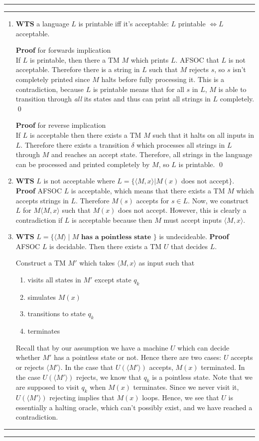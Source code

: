\documentclass[11pt]{article}
\newcounter{questionCounter}
\newcounter{partCounter}[questionCounter]
\newenvironment{question}[2][\arabic{questionCounter}]{%
    \setcounter{partCounter}{0}%
    \vspace{.25in} \hrule \vspace{0.5em}%
        \noindent{\bf #2}%
    \vspace{0.8em} \hrule \vspace{.10in}%
    \addtocounter{questionCounter}{1}%
}{}
\begin{document}
\begin{question}{Computers Have Printers!}
\begin{enumerate}
\item \textbf{WTS} a language $L$ is printable iff it's acceptable: $L$ printable $\iff L$ acceptable.

\textbf{Proof} for forwards implication\\
If $L$ is printable, then there a TM $M$ which prints $L$. AFSOC that $L$ is not acceptable. 
Therefore there is a string in $L$ such that $M$ rejects $s$, so $s$
isn't completely printed since $M$ halts before fully processing it.
This is a contradiction, because $L$ is printable means that for all $s$  in $L$, 
$M$ is able to transition through \emph{all} its states and thus can print all strings in $L$ completely. \qed

\textbf{Proof} for reverse implication\\ 
If $L$ is acceptable then there exists a TM $M$ such that it halts on all inputs in $L$.
Therefore there exists a transition $\delta$ which processes all strings in $L$ through $M$ and reaches an accept state.
Therefore, all strings in the language can be processed and printed completely by $M$, so $L$ is printable. \qed

\item \textbf{WTS} $L$ is not acceptable where $L = \{\langle M, x\rangle | M(x)$ does not accept$\}$.\\
\textbf{Proof} AFSOC $L$ is acceptable, which means that there exists a TM $M$ which accepts strings
in $L$. Therefore $M(s)$ accepts for $s \in L$. 
Now, we construct $L$ for $M\langle M, x\rangle$ such that $M(x)$ does not accept. However, this 
is clearly a contradiction if $L$ is acceptable because then $M$ must accept inputs $\langle M, x\rangle$.

\item \textbf{WTS} $L = \{ \langle M \rangle \mid M \textbf{ has a pointless state } \}$ is undecideable.
\textbf{Proof} AFSOC $L$ is decidable. Then there exists a TM $U$ that decides $L$.

Construct a TM $M'$ which takes $\langle M, x\rangle$ as input such that
\begin{enumerate}
\item visits all states in $M'$ except state $q_{k}$
\item simulates $M(x)$ 
\item transitions to state $q_{k}$ 
\item terminates
\end{enumerate}
Recall that by our assumption we have a machine $U$ which can decide whether 
$M'$ has a pointless state or not. Hence there are two cases: $U$ accepts or 
rejects $\langle M' \rangle$. In the case that $U(\langle M' \rangle)$ accepts, 
$M(x)$ terminated. In the case $U(\langle M' \rangle)$ rejects, 
we know that $q_{k}$ is a pointless state. Note that we are supposed to visit $q_{k}$ when $M(x)$ terminates.
Since we never visit it, $U(\langle M' \rangle)$ rejecting implies that $M(x)$ loops.
Hence, we see that $U$ is essentially a halting oracle, which can't possibly exist, and we have
reached a contradiction.
\end{enumerate}
\end{question}
\begin{question}{LambdaLaTeX}
\end{question}
\end{document}
